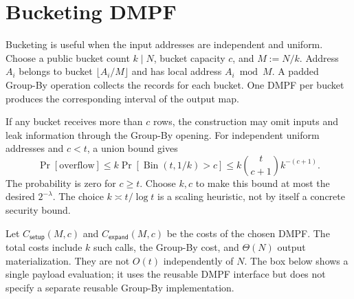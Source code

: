 \section{Bucketing DMPF}\label{sec:bucketing}

Bucketing is useful when the input addresses are independent and uniform.
Choose a public bucket count $k\mid N$, bucket capacity $c$, and
$M:=N/k$. Address $A_i$ belongs to bucket $\lfloor A_i/M\rfloor$ and has
local address $A_i\bmod M$. A padded Group-By operation collects the records
for each bucket. One DMPF per bucket produces the corresponding interval of
the output map.

If any bucket receives more than $c$ rows, the construction may omit inputs
and leak information through the Group-By opening.
For independent uniform addresses and $c<t$, a union bound gives
\[
 \Pr[\text{overflow}]
 \leq k\Pr[\operatorname{Bin}(t,1/k)>c]
 \leq k\binom{t}{c+1}k^{-(c+1)}.
\]
The probability is zero for $c\geq t$.
Choose $k,c$ to make this bound at most the desired $2^{-\lambda}$.
The choice $k\asymp t/\log t$ is a scaling heuristic, not by itself a
concrete security bound.

Let $C_{\mathsf{setup}}(M,c)$ and $C_{\mathsf{expand}}(M,c)$ be the costs
of the chosen DMPF. The total costs include $k$ such calls, the Group-By
cost, and $\Theta(N)$ output materialization.
They are not $O(t)$ independently of $N$.
The box below shows a single payload evaluation; it uses the reusable DMPF
interface but does not specify a separate reusable Group-By implementation.

